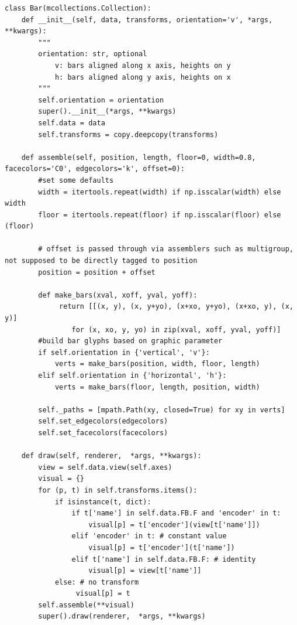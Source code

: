 \documentclass[../main.tex]{subfiles}
\begin{document}
\begin{verbatim}
class Bar(mcollections.Collection):
    def __init__(self, data, transforms, orientation='v', *args, **kwargs):
        """
        orientation: str, optional
            v: bars aligned along x axis, heights on y
            h: bars aligned along y axis, heights on x
        """
        self.orientation = orientation
        super().__init__(*args, **kwargs)
        self.data = data
        self.transforms = copy.deepcopy(transforms)

    def assemble(self, position, length, floor=0, width=0.8, facecolors='C0', edgecolors='k', offset=0):
        #set some defaults
        width = itertools.repeat(width) if np.isscalar(width) else width
        floor = itertools.repeat(floor) if np.isscalar(floor) else (floor)
        
        # offset is passed through via assemblers such as multigroup, not supposed to be directly tagged to position 
        position = position + offset
        
        def make_bars(xval, xoff, yval, yoff):
             return [[(x, y), (x, y+yo), (x+xo, y+yo), (x+xo, y), (x, y)] 
                for (x, xo, y, yo) in zip(xval, xoff, yval, yoff)]
        #build bar glyphs based on graphic parameter
        if self.orientation in {'vertical', 'v'}:
            verts = make_bars(position, width, floor, length)
        elif self.orientation in {'horizontal', 'h'}:
            verts = make_bars(floor, length, position, width)
        
        self._paths = [mpath.Path(xy, closed=True) for xy in verts]
        self.set_edgecolors(edgecolors)
        self.set_facecolors(facecolors)
        
    def draw(self, renderer,  *args, **kwargs):
        view = self.data.view(self.axes)
        visual = {}
        for (p, t) in self.transforms.items():
            if isinstance(t, dict):
                if t['name'] in self.data.FB.F and 'encoder' in t:
                    visual[p] = t['encoder'](view[t['name']])
                elif 'encoder' in t: # constant value
                    visual[p] = t['encoder'](t['name'])
                elif t['name'] in self.data.FB.F: # identity 
                    visual[p] = view[t['name']]
            else: # no transform 
                 visual[p] = t
        self.assemble(**visual)
        super().draw(renderer,  *args, **kwargs)
    
\end{verbatim}
\end{document}
